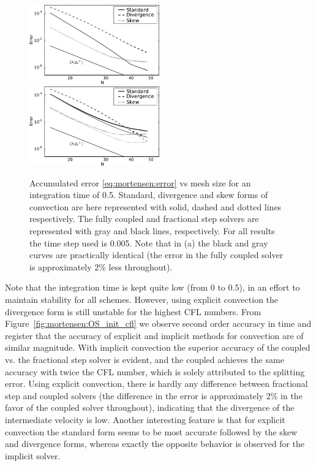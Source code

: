 \begin{figure}
 \includegraphics[width=0.5\textwidth]{chapters/mortensen/pdf/OS_init_dx_1.pdf}
%
 \includegraphics[width=0.5\textwidth]{chapters/mortensen/pdf/OS_init_dx_0.pdf}
%
 \caption{Accumulated error \eqref{eq:mortensen:error} vs mesh size
   for an integration time of 0.5. Standard, divergence and skew forms
   of convection are here represented with solid, dashed and dotted
   lines respectively. The fully coupled and fractional step solvers
   are represented with gray and black lines, respectively. For all
   results the time step used is 0.005. Note that in (a) the black and
   gray curves are practically identical (the error in the fully
   coupled solver is approximately 2\% less throughout). }
\label{fig:mortensen:OS_init_dx}
\end{figure}
Note that the integration time is kept quite low (from 0 to 0.5), in
an effort to maintain stability for all schemes. However, using
explicit convection the divergence form is still unstable for the
highest CFL numbers. From Figure~\ref{fig:mortensen:OS_init_cfl} we
observe second order accuracy in time and register that the accuracy
of explicit and implicit methods for convection are of similar
magnitude. With implicit convection the superior accuracy of the
coupled vs. the fractional step solver is evident, and the coupled
achieves the same accuracy with twice the CFL number, which is solely
attributed to the splitting error. Using explicit convection, there is
hardly any difference between fractional step and coupled solvers (the
difference in the error is approximately 2\% in the favor of the
coupled solver throughout), indicating that the divergence of the
intermediate velocity is low. Another interesting feature is that for
explicit convection the standard form seems to be most accurate
followed by the skew and divergence forms, whereas exactly the
opposite behavior is observed for the implicit solver.

